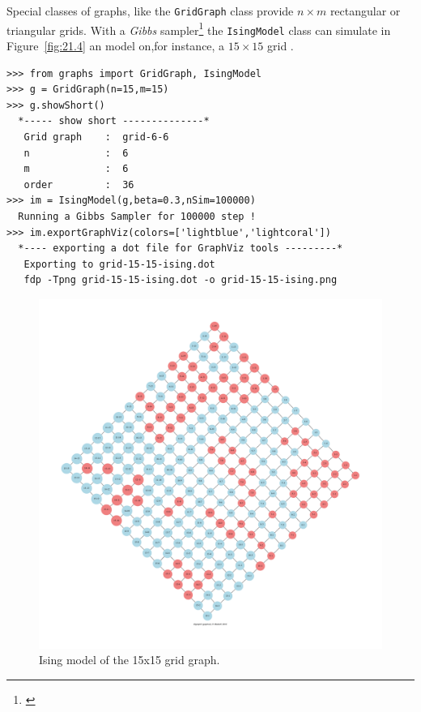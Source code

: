 Special classes of graphs, like the \texttt{GridGraph} class provide $n \times m$ rectangular or triangular grids. With a \emph{Gibbs} sampler\footnote{\citet{GEM-1984}} the \texttt{IsingModel} class can simulate in Figure~\vref{fig:21.4} an \Ising model on,for instance, a $15 \times 15$ grid \citep{ISI-1925}.
\begin{lstlisting}[caption={Simulating an Ising model on a the $15 \times 15$ rectangular grid},label=list:21.11]
>>> from graphs import GridGraph, IsingModel
>>> g = GridGraph(n=15,m=15)
>>> g.showShort()
  *----- show short --------------*
   Grid graph    :  grid-6-6
   n             :  6
   m             :  6
   order         :  36
>>> im = IsingModel(g,beta=0.3,nSim=100000)
  Running a Gibbs Sampler for 100000 step !
>>> im.exportGraphViz(colors=['lightblue','lightcoral'])
  *---- exporting a dot file for GraphViz tools ---------*
   Exporting to grid-15-15-ising.dot
   fdp -Tpng grid-15-15-ising.dot -o grid-15-15-ising.png
\end{lstlisting}
\begin{figure}[ht]
\includegraphics[width=\hsize]{Figures/21-4-grid-15-15-ising.pdf}
\caption{Ising model of the 15x15 grid graph.} 
\label{fig:21.4}       %
\end{figure}

